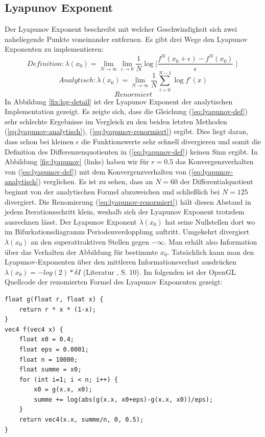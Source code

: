 \documentclass[12pt,a4paper]{article}
\begin{document}
\subsection{Lyapunov Exponent}
Der Lyapunov Exponent beschreibt mit welcher Geschwindigkeit sich zwei naheliegende Punkte voneinander entfernen. 
Es gibt drei Wege den Lyapunov Exponenten zu implementieren:
\begin{equation}
Definition: \lambda(x_0) = \lim_{N \rightarrow \infty}\lim_{\epsilon \rightarrow 0} \frac{1}{N}\log{\mid \frac{f^N(x_0+\epsilon)- f^N(x_0)}{\epsilon} \mid} 
\label{eq:lyapunov-def}
\end{equation}
\begin{equation}
Analytisch: \lambda(x_0) = \lim_{N \rightarrow \infty} \frac{1}{N} \sum_{i=0}^{N-1}  \log{f'(x)} 
\label{eq:lyapunov-analytisch}
\end{equation}
\begin{equation}
Renormiert
\label{eq:lyapunov-renormiert}
\end{equation}
In Abbildung \ref{fix:log-detail} ist der Lyapunov Exponent der analytischen Implementation gezeigt.
Es zeigte sich, dass die Gleichung (\ref{eq:lyapunov-def}) sehr schlechte Ergebnisse im Vergleich zu den beiden letzten Methoden (\ref{eq:lyapunov-analytisch}), (\ref{eq:lyapunov-renormiert}) ergibt.
Dies liegt daran, dass schon bei kleinen $\epsilon$ die Funktionswerte sehr schnell divergieren und somit die Definition des Differenzenquotienten in (\ref{eq:lyapunov-def}) keinen Sinn ergibt.
In Abbildung \ref{fig:lyapunov} (links) haben wir für $r=0.5$ das Konvergenzverhalten von (\ref{eq:lyapunov-def}) mit dem Konvergenzverhalten von (\ref{eq:lyapunov-analytisch}) verglichen. Es ist zu sehen, dass an $N=60$ der Differentialquotient beginnt von der analytischen Formel abzuweichen und schließlich bei $N=125$ divergiert.
Die Renomierung (\ref{eq:lyapunov-renormiert}) hält diesen Abstand in jedem Iterationsschritt klein, weshalb sich der Lyapunov Exponent trotzdem ausrechnen lässt.
Der Lyapunov Exponent $\lambda(x_0)$ hat seine Nullstellen dort wo im Bifurkationsdiagramm Periodenverdopplung auftritt. Umgekehrt divergiert $\lambda(x_0)$ an den superattraktiven Stellen gegen $-\infty$.
Man erhält also Information über das Verhalten der Abbildung für bestimmte $x_0$.
Tatsächlich kann man den Lyapunov-Exponenten über den mittleren Informationsverlust ausdrücken $\lambda(x_0)=-log(2)*\delta I$ (Literatur \parencite{versuchmappe}, S. 10).
Im folgenden ist der OpenGL Quellcode der renomierten Formel des Lyapunov Exponenten gezeigt:
\begin{lstlisting}
float g(float r, float x) {
    return r * x * (1-x);
}
vec4 f(vec4 x) {
    float x0 = 0.4;
    float eps = 0.0001;
    float n = 10000;
    float summe = x0;
    for (int i=1; i < n; i++) {
        x0 = g(x.x, x0);
        summe += log(abs(g(x.x, x0+eps)-g(x.x, x0))/eps);
    }
    return vec4(x.x, summe/n, 0, 0.5);
}
\end{lstlisting}
\end{document}
